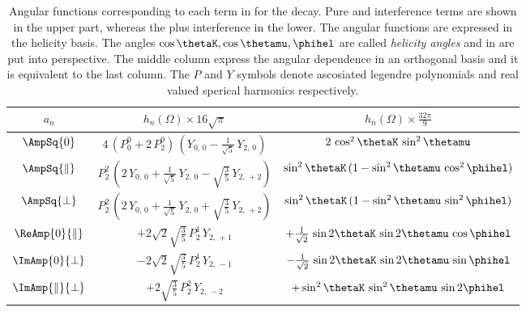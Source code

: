 \begin{table}[!h]
  \centering 
  \caption{ Angular functions corresponding to each term in  for the \BJpsiKst decay. Pure and interference \pwave terms are shown in the upper part, 
    whereas the \swave plus \spwave interference in the lower. The angular functions are expressed in the helicity basis. The angles $\cos\thetaK,\cos\thetamu,\phihel$
    are called \emph{helicity angles} and in  are put into perspective. The middle column express the angular dependence in an orthogonal basis and it
    is equivalent to the last column. The $P$ and $Y$ symbols denote ascosiated legendre polynomials and real valued sperical harmonics
    respectively. }
  \renewcommand{\arraystretch}{1.2}
  \label{ang_distr}
  \begin{tabular}{ccc}
    \hline
    $a_n$                             &
      $h_n(\Omega) \times 16\sqrt{\pi}$      &
      $h_n(\Omega) \times \tfrac{32\pi}{9}$  \\

    \hline
    $\AmpSq{0}$  &
      $4\, (P_0^0 + 2\, P_2^0)\, (Y_{0,\,0} - \tfrac{1}{\sqrt{5}}\, Y_{2,\,0})$  &
      $2\, \cos^2\thetaK\, \sin^2\thetamu$  \\

    $\AmpSq{\parallel}$  &
      $P_2^2\, (2\, Y_{0,\,0} + \tfrac{1}{\sqrt{5}}\, Y_{2,\,0} - \sqrt{\tfrac{3}{5}}\, Y_{2,\,+2})$  &
      $\sin^2\thetaK\, (1 - \sin^2\thetamu\, \cos^2\phihel)$  \\

    $\AmpSq{\perp}$  &
      $P_2^2\, (2\, Y_{0,\,0} + \tfrac{1}{\sqrt{5}}\, Y_{2,\,0} + \sqrt{\tfrac{3}{5}}\, Y_{2,\,+2})$  &
      $\sin^2\thetaK\, (1 - \sin^2\thetamu\, \sin^2\phihel)$  \\

    $\ReAmp{0}{\parallel}$  &
      $+2\sqrt{2}\sqrt{\tfrac{3}{5}}\, P_2^1\, Y_{2,\,+1}$  &
      $+\frac{1}{\sqrt{2}}\, \sin2\thetaK\, \sin2\thetamu\, \cos\phihel$  \\

    $\ImAmp{0}{\perp}$  &
      $-2\sqrt{2}\sqrt{\tfrac{3}{5}}\, P_2^1\, Y_{2,\,-1}$  &
      $-\frac{1}{\sqrt{2}}\, \sin2\thetaK\, \sin2\thetamu\, \sin\phihel$  \\


    $\ImAmp{\parallel}{\perp}$  &
      $+2\sqrt{\tfrac{3}{5}}\, P_2^2\, Y_{2,\,-2}$  &
      $+\sin^2\thetaK\, \sin^2\thetamu\, \sin2\phihel$  \\


\end{tabular}
\end{table}
